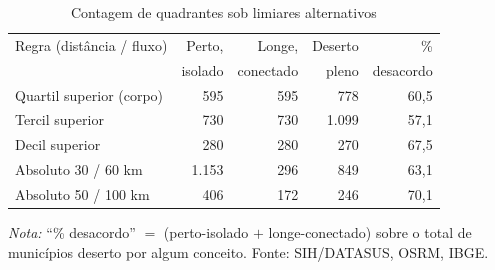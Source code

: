 \begin{table}[t]
\centering
\caption{Contagem de quadrantes sob limiares alternativos}
\label{tab:limiares}
\small
\begin{tabular}{lrrrr}
\toprule
Regra (distância / fluxo) & Perto, & Longe, & Deserto & \% \\
                          & isolado & conectado & pleno & desacordo \\
\midrule
Quartil superior (corpo) & 595   & 595 & 778   & 60{,}5 \\
Tercil superior          & 730   & 730 & 1.099 & 57{,}1 \\
Decil superior           & 280   & 280 & 270   & 67{,}5 \\
Absoluto 30 / 60 km      & 1.153 & 296 & 849   & 63{,}1 \\
Absoluto 50 / 100 km     & 406   & 172 & 246   & 70{,}1 \\
\bottomrule
\end{tabular}
\par\smallskip
\begin{minipage}{0.80\linewidth}
\footnotesize
\textit{Nota:} ``\% desacordo'' $=$ (perto-isolado $+$ longe-conectado) sobre o
total de municípios deserto por algum conceito. Fonte: SIH/DATASUS, OSRM, IBGE.
\end{minipage}
\end{table}
